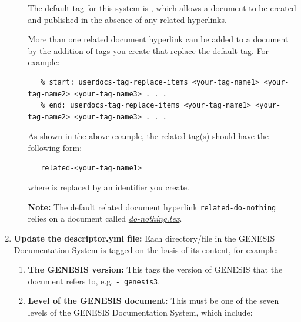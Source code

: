 \documentclass[12pt]{article}
\begin{document}
\begin{enumerate}
\begin{itemize}
The default tag for this system is {\tt <related-do-nothing>}, which allows a document to be created and published in the absence of any related hyperlinks. 

More than one related document hyperlink can be added to a document by the addition of tags you create that replace the default tag. For example:
\begin{verbatim}
   % start: userdocs-tag-replace-items <your-tag-name1> <your-tag-name2> <your-tag-name3> . . .
   % end: userdocs-tag-replace-items <your-tag-name1> <your-tag-name2> <your-tag-name3> . . .
\end{verbatim}

As shown in the above example, the related tag(s) should have the following form:
\begin{verbatim}
   related-<your-tag-name1>
\end{verbatim}
where {\tt <your-tag-name1>} is replaced by an identifier you create. %

{\bf Note:} The default related document hyperlink {\tt related-do-nothing} relies on a document called \href{../do-nothing/do-nothing.tex}{\it do-nothing.tex}.
\end{itemize}

\item[]{\bf Update the descriptor.yml file:} Each directory/file in the GENESIS Documentation System is tagged on the basis of its content, for example:

   \begin{enumerate}

      \item[]{\bf The GENESIS version:} This tags the version of GENESIS that the document refers to, e.g. {\tt -\,genesis3}.

      \item[]{\bf Level of the GENESIS document:} This must be one of the seven levels of the GENESIS Documentation System, which include:
      

\end{enumerate}
\end{enumerate}
\end{document}
